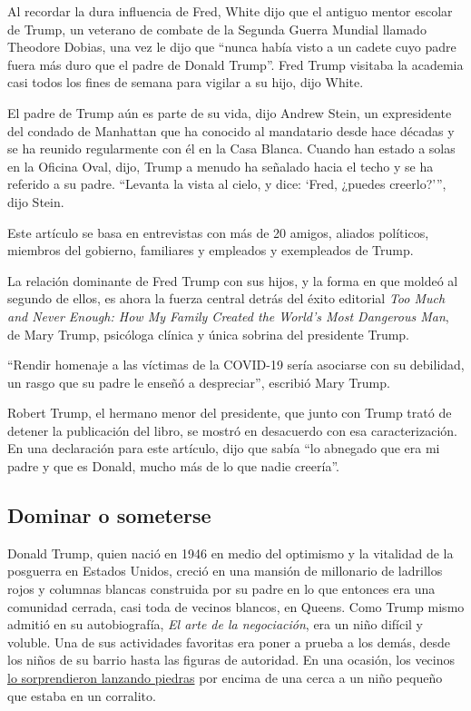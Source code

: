 Al recordar la dura influencia de Fred, White dijo que el antiguo mentor
escolar de Trump, un veterano de combate de la Segunda Guerra Mundial
llamado Theodore Dobias, una vez le dijo que ``nunca había visto a un
cadete cuyo padre fuera más duro que el padre de Donald Trump''. Fred
Trump visitaba la academia casi todos los fines de semana para vigilar a
su hijo, dijo White.

El padre de Trump aún es parte de su vida, dijo Andrew Stein, un
expresidente del condado de Manhattan que ha conocido al mandatario
desde hace décadas y se ha reunido regularmente con él en la Casa
Blanca. Cuando han estado a solas en la Oficina Oval, dijo, Trump a
menudo ha señalado hacia el techo y se ha referido a su padre. ``Levanta
la vista al cielo, y dice: `Fred, ¿puedes creerlo?''', dijo Stein.

Este artículo se basa en entrevistas con más de 20 amigos, aliados
políticos, miembros del gobierno, familiares y empleados y exempleados
de Trump.

La relación dominante de Fred Trump con sus hijos, y la forma en que
moldeó al segundo de ellos, es ahora la fuerza central detrás del éxito
editorial \emph{Too Much and Never Enough: How My Family Created the
World's Most Dangerous Man}, de Mary Trump, psicóloga clínica y única
sobrina del presidente Trump.

``Rendir homenaje a las víctimas de la COVID-19 sería asociarse con su
debilidad, un rasgo que su padre le enseñó a despreciar'', escribió Mary
Trump.

Robert Trump, el hermano menor del presidente, que junto con Trump trató
de detener la publicación del libro, se mostró en desacuerdo con esa
caracterización. En una declaración para este artículo, dijo que sabía
``lo abnegado que era mi padre y que es Donald, mucho más de lo que
nadie creería''.

\hypertarget{dominar-o-someterse}{%
\subsection{Dominar o someterse}\label{dominar-o-someterse}}

Donald Trump, quien nació en 1946 en medio del optimismo y la vitalidad
de la posguerra en Estados Unidos, creció en una mansión de millonario
de ladrillos rojos y columnas blancas construida por su padre en lo que
entonces era una comunidad cerrada, casi toda de vecinos blancos, en
Queens. Como Trump mismo admitió en su autobiografía, \emph{El arte de
la negociación}, era un niño difícil y voluble. Una de sus actividades
favoritas era poner a prueba a los demás, desde los niños de su barrio
hasta las figuras de autoridad. En una ocasión, los vecinos
\href{https://www.washingtonpost.com/lifestyle/style/young-donald-trump-military-school/2016/06/22/f0b3b164-317c-11e6-8758-d58e76e11b12_story.html}{lo
sorprendieron lanzando piedras} por encima de una cerca a un niño
pequeño que estaba en un corralito.

